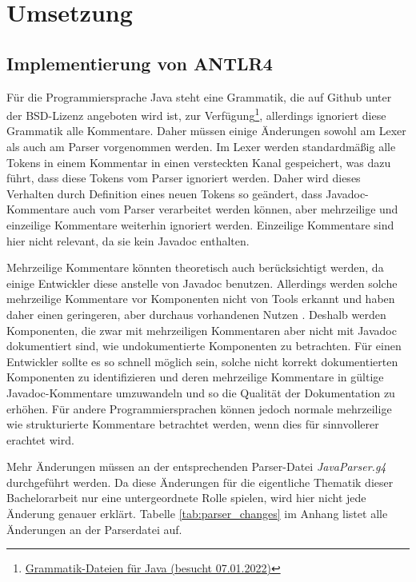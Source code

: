 \chapter{Umsetzung}
\section{Implementierung von ANTLR4}\label{chapter:antlr4_impl}
Für die Programmiersprache Java steht eine Grammatik, die auf Github unter der BSD-Lizenz angeboten wird ist, zur Verfügung\footnote{\href{https://github.com/antlr/grammars-v4/tree/master/java/java}{Grammatik-Dateien für Java (besucht 07.01.2022)}}, allerdings ignoriert diese Grammatik alle Kommentare. Daher müssen einige Änderungen sowohl am Lexer als auch am Parser vorgenommen werden. Im Lexer werden standardmäßig alle Tokens in einem Kommentar in einen versteckten Kanal gespeichert, was dazu führt, dass diese Tokens vom Parser ignoriert werden. Daher wird dieses Verhalten durch Definition eines neuen Tokens so geändert, dass Javadoc-Kommentare auch vom Parser verarbeitet werden können, aber mehrzeilige und einzeilige Kommentare weiterhin ignoriert werden. Einzeilige Kommentare sind hier nicht relevant, da sie kein Javadoc enthalten.

Mehrzeilige Kommentare könnten theoretisch auch berücksichtigt werden, da einige Entwickler diese anstelle von Javadoc benutzen. Allerdings werden solche mehrzeilige Kommentare vor Komponenten nicht von Tools erkannt und haben daher einen geringeren, aber durchaus vorhandenen Nutzen \cite[S. 4]{HowDocumentationEvolvesoverTime}. Deshalb werden Komponenten, die zwar mit mehrzeiligen Kommentaren aber nicht mit Javadoc dokumentiert sind, wie undokumentierte Komponenten zu betrachten. Für einen Entwickler sollte es so schnell möglich sein, solche nicht korrekt dokumentierten Komponenten zu identifizieren und deren mehrzeilige Kommentare in gültige Javadoc-Kommentare umzuwandeln und so die Qualität der Dokumentation zu erhöhen. Für andere Programmiersprachen können jedoch normale mehrzeilige wie strukturierte Kommentare betrachtet werden, wenn dies für sinnvollerer erachtet wird.

Mehr Änderungen müssen an der entsprechenden Parser-Datei \textit{JavaParser.g4} durchgeführt werden.  Da diese Änderungen für die eigentliche Thematik dieser Bachelorarbeit nur eine untergeordnete Rolle spielen, wird hier nicht jede Änderung genauer erklärt. Tabelle \ref{tab:parser_changes} im Anhang listet alle Änderungen an der Parserdatei auf. 

